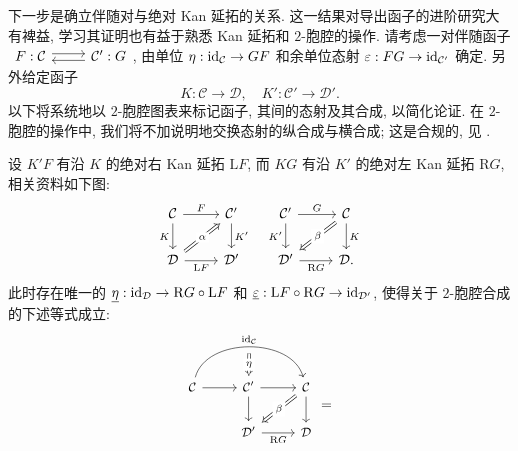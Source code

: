 下一步是确立伴随对与绝对 Kan 延拓的关系. 这一结果对导出函子的进阶研究大有裨益, 学习其证明也有益于熟悉 Kan 延拓和 $2$-胞腔的操作. 请考虑一对伴随函子
$\begin{tikzcd}
	F: \mathcal{C} \arrow[r, shift left] & \mathcal{C}' \arrow[l, shift left] : G
\end{tikzcd}$,
由单位 $\eta: \mathrm{id}_{\mathcal{C}} \to GF$ 和余单位态射 $\varepsilon: FG \to \mathrm{id}_{\mathcal{C}'}$ 确定. 另外给定函子
\[ K: \mathcal{C} \to \mathcal{D}, \quad K': \mathcal{C}' \to \mathcal{D}'. \]
以下将系统地以 $2$-胞腔图表来标记函子, 其间的态射及其合成, 以简化论证. 在 $2$-胞腔的操作中, 我们将不加说明地交换态射的纵合成与横合成; 这是合规的, 见 \cite[引理 2.2.7]{Li1}.

\begin{theorem}\label{prop:Quillen-adjunction-gen}
	设 $K'F$ 有沿 $K$ 的绝对右 Kan 延拓 $\mathrm{L}F$, 而 $KG$ 有沿 $K'$ 的绝对左 Kan 延拓 $\mathrm{R}G$, 相关资料如下图:
	\[\begin{tikzcd}
		\mathcal{C} \arrow[r, "F"] \arrow[d, "K"'] & \mathcal{C}' \arrow[d, "{K'}"] \\
		\mathcal{D} \arrow[r, "{\mathrm{L}F}"'] \arrow[Rightarrow, ru, "\alpha" description] & \mathcal{D}'
	\end{tikzcd} \quad \begin{tikzcd}
		\mathcal{C}' \arrow[r, "G"] \arrow[d, "{K'}"'] & \mathcal{C} \arrow[d, "K"] \arrow[Rightarrow, ld, "\beta" description] \\
		\mathcal{D}' \arrow[r, "{\mathrm{R}G}"'] & \mathcal{D} .
	\end{tikzcd} \]
	此时存在唯一的 $\underline{\eta}: \mathrm{id}_{\mathcal{D}} \to \mathrm{R}G \circ \mathrm{L}F$ 和 $\underline{\varepsilon}: \mathrm{L}F \circ \mathrm{R}G \to \mathrm{id}_{\mathcal{D}'}$, 使得关于 $2$-胞腔合成的下述等式成立:
	\begin{equation*}\begin{gathered}
		\begin{tikzcd}[every cell/.append style = {font = \small}]
			\mathcal{C} \arrow[r] \arrow[rr, bend left=75, "{\identity_{\mathcal{C}}}", ""' {name=I}] & \mathcal{C}' \arrow[r] \arrow[d] \arrow[Rightarrow, from=I, "\eta" description] & \mathcal{C} \arrow[d] \arrow[Rightarrow, ld, "\beta" description] \\
			& \mathcal{D}' \arrow[r, "{\mathrm{R}G}"'] & \mathcal{D}
		\end{tikzcd} = \begin{tikzcd}[every cell/.append style = {font = \small}]

\end{tikzcd}
\end{gathered}
\end{equation*}
\end{theorem}
